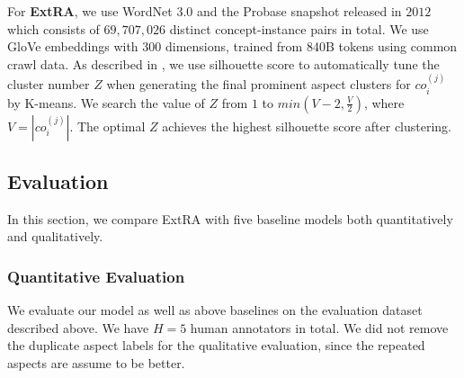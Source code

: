 
For \textbf{ExtRA},  
we use WordNet $3.0$ and the Probase snapshot
released in $2012$
which consists of $69,707,026$
distinct concept-instance pairs in total.
We use GloVe embeddings 
with 300 dimensions, trained from 840B tokens using common crawl data. 
As described in ,
we use silhouette score to automatically tune the 
cluster number $Z$ when generating the
final prominent aspect clusters for $co_i^{(j)}$ by
K-means.
We search the value of $Z$ from $1$ to $min(V-2, \frac{V}{2})$,
where $V=|co_i^{(j)}|$.
The optimal $Z$ achieves the 
highest silhouette score after clustering.


\subsection{Evaluation}
\label{sec:endeval}
In this section, we compare ExtRA with five baseline models 
both quantitatively and qualitatively.

\subsubsection{Quantitative Evaluation}
\label{sec:quaneval}



We evaluate our model as well as above baselines on the evaluation dataset described above.
We have $H=5$ human annotators in total.
We did not remove the duplicate aspect labels for the qualitative evaluation, 
since the repeated aspects are assume to be better.

